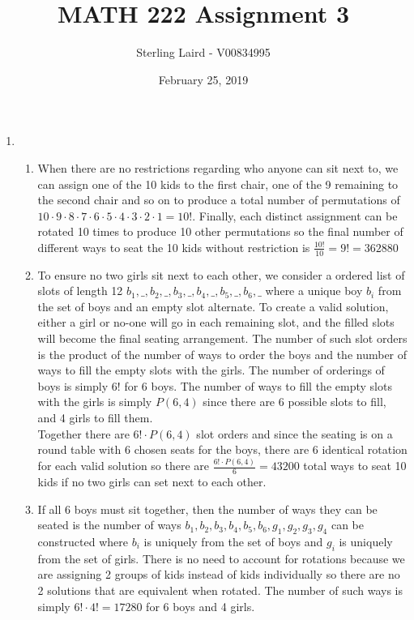 \documentclass[11pt]{article}
\title{MATH 222 Assignment 3}
\author{Sterling Laird - V00834995}
\date{February 25, 2019}
\begin{document}
\maketitle
\pagebreak

\begin{enumerate}[]
\item
\begin{enumerate}[label=\alph*]
\item
	When there are no restrictions regarding who anyone can sit next to, we can assign one of the 10 kids to the first chair, one of the 9 remaining to the second chair and so on to produce a total number of permutations of $10\cdot9\cdot8\cdot7\cdot6\cdot5\cdot4\cdot3\cdot2\cdot1 = 10!$. Finally, each distinct assignment can be rotated 10 times to produce 10 other permutations so the final number of different ways to seat the 10 kids without restriction is $\frac{10!}{10} = 9! = 362880$
\item
	To ensure no two girls sit next to each other, we consider a ordered list of slots of length 12 $b_1,\_,b_2,\_,b_3,\_,b_4,\_,b_5,\_,b_6,\_$ where a unique boy $b_i$ from the set of boys and an empty slot alternate. To create a valid solution, either a girl or no-one will go in each remaining slot, and the filled slots will become the final seating arrangement. The number of such slot orders is the product of the number of ways to order the boys and the number of ways to fill the empty slots with the girls. The number of orderings of boys is simply $6!$ for 6 boys. The number of ways to fill the empty slots with the girls is simply $P(6,4)$ since there are 6 possible slots to fill, and 4 girls to fill them.\\
	Together there are $6!\cdot P(6,4)$ slot orders and since the seating is on a round table with 6 chosen seats for the boys, there are 6 identical rotation for each valid solution so there are $\frac{6!\cdot P(6,4)}{6} = 43200$ total ways to seat 10 kids if no two girls can set next to each other.
\item
	If all 6 boys must sit together, then the number of ways they can be seated is the number of ways $b_1,b_2,b_3,b_4,b_5,b_6,g_1,g_2,g_3,g_4$ can be constructed where $b_i$ is uniquely from the set of boys and $g_i$ is uniquely from the set of girls. There is no need to account for rotations because we are assigning 2 groups of kids instead of kids individually so there are no 2 solutions that are equivalent when rotated. The number of such ways is simply $6!\cdot4! = 17280$ for 6 boys and 4 girls.
\end{enumerate}

\end{enumerate}
\end{document}
